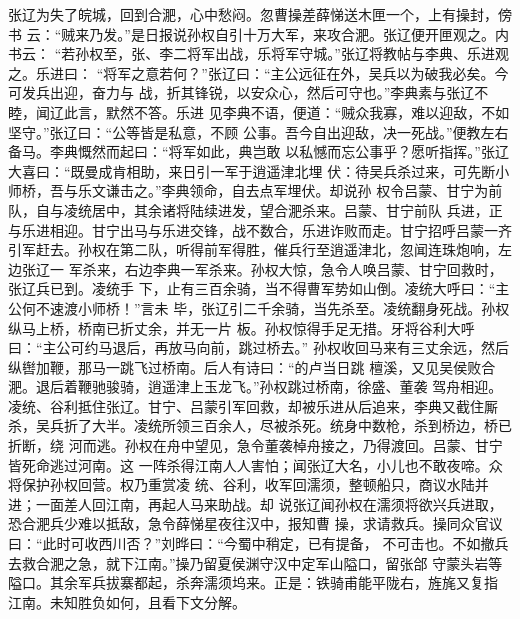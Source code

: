 张辽为失了皖城，回到合淝，心中愁闷。忽曹操差薛悌送木匣一个，上有操封，傍书
云：“贼来乃发。”是日报说孙权自引十万大军，来攻合淝。张辽便开匣观之。内书云：
“若孙权至，张、李二将军出战，乐将军守城。”张辽将教帖与李典、乐进观之。乐进曰：
“将军之意若何？”张辽曰：“主公远征在外，吴兵以为破我必矣。今可发兵出迎，奋力与
战，折其锋锐，以安众心，然后可守也。”李典素与张辽不睦，闻辽此言，默然不答。乐进
见李典不语，便道：“贼众我寡，难以迎敌，不如坚守。”张辽曰：“公等皆是私意，不顾
公事。吾今自出迎敌，决一死战。”便教左右备马。李典慨然而起曰：“将军如此，典岂敢
以私憾而忘公事乎？愿听指挥。”张辽大喜曰：“既曼成肯相助，来日引一军于逍遥津北埋
伏：待吴兵杀过来，可先断小师桥，吾与乐文谦击之。”李典领命，自去点军埋伏。却说孙
权令吕蒙、甘宁为前队，自与凌统居中，其余诸将陆续进发，望合淝杀来。吕蒙、甘宁前队
兵进，正与乐进相迎。甘宁出马与乐进交锋，战不数合，乐进诈败而走。甘宁招呼吕蒙一齐
引军赶去。孙权在第二队，听得前军得胜，催兵行至逍遥津北，忽闻连珠炮响，左边张辽一
军杀来，右边李典一军杀来。孙权大惊，急令人唤吕蒙、甘宁回救时，张辽兵已到。凌统手
下，止有三百余骑，当不得曹军势如山倒。凌统大呼曰：“主公何不速渡小师桥！”言未
毕，张辽引二千余骑，当先杀至。凌统翻身死战。孙权纵马上桥，桥南已折丈余，并无一片
板。孙权惊得手足无措。牙将谷利大呼曰：“主公可约马退后，再放马向前，跳过桥去。”
孙权收回马来有三丈余远，然后纵辔加鞭，那马一跳飞过桥南。后人有诗曰：“的卢当日跳
檀溪，又见吴侯败合淝。退后着鞭驰骏骑，逍遥津上玉龙飞。”孙权跳过桥南，徐盛、董袭
驾舟相迎。凌统、谷利抵住张辽。甘宁、吕蒙引军回救，却被乐进从后追来，李典又截住厮
杀，吴兵折了大半。凌统所领三百余人，尽被杀死。统身中数枪，杀到桥边，桥已折断，绕
河而逃。孙权在舟中望见，急令董袭棹舟接之，乃得渡回。吕蒙、甘宁皆死命逃过河南。这
一阵杀得江南人人害怕；闻张辽大名，小儿也不敢夜啼。众将保护孙权回营。权乃重赏凌
统、谷利，收军回濡须，整顿船只，商议水陆并进；一面差人回江南，再起人马来助战。却
说张辽闻孙权在濡须将欲兴兵进取，恐合淝兵少难以抵敌，急令薛悌星夜往汉中，报知曹
操，求请救兵。操同众官议曰：“此时可收西川否？”刘晔曰：“今蜀中稍定，已有提备，
不可击也。不如撤兵去救合淝之急，就下江南。”操乃留夏侯渊守汉中定军山隘口，留张郃
守蒙头岩等隘口。其余军兵拔寨都起，杀奔濡须坞来。正是：铁骑甫能平陇右，旌旄又复指
江南。未知胜负如何，且看下文分解。